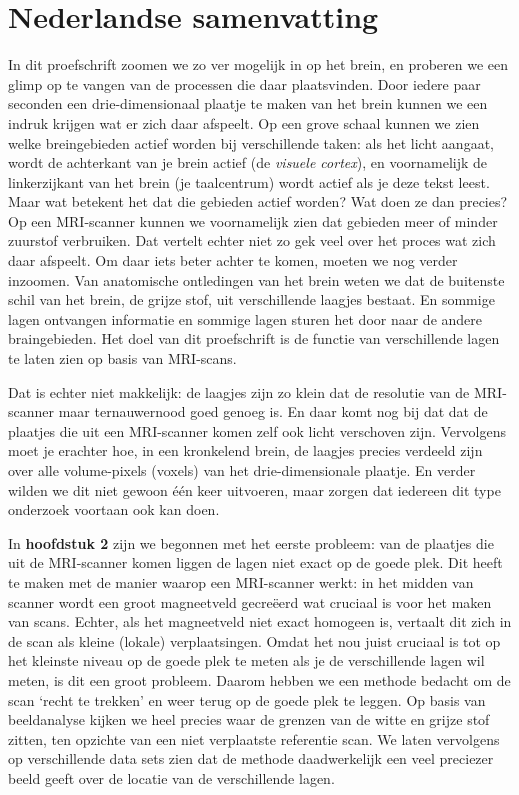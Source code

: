 \section{Nederlandse samenvatting}
In dit proefschrift zoomen we zo ver mogelijk in op het brein, en proberen we een glimp op te vangen van de processen die daar plaatsvinden. Door iedere paar seconden een drie-dimensionaal plaatje te maken van het brein kunnen we een indruk krijgen wat er zich daar afspeelt. Op een grove schaal kunnen we zien welke breingebieden actief worden bij verschillende taken: als het licht aangaat, wordt de achterkant van je brein actief (de \emph{visuele cortex}), en voornamelijk de linkerzijkant van het brein (je taalcentrum) wordt actief als je deze tekst leest. Maar wat betekent het dat die gebieden actief worden? Wat doen ze dan precies? Op een MRI-scanner kunnen we voornamelijk zien dat gebieden meer of minder zuurstof verbruiken. Dat vertelt echter niet zo gek veel over het proces wat zich daar afspeelt. Om daar iets beter achter te komen, moeten we nog verder inzoomen. Van anatomische ontledingen van het brein weten we dat de buitenste schil van het brein, de grijze stof, uit verschillende laagjes bestaat. En sommige lagen ontvangen informatie en sommige lagen sturen het door naar de andere braingebieden. Het doel van dit proefschrift is de functie van verschillende lagen te laten zien op basis van MRI-scans.

Dat is echter niet makkelijk: de laagjes zijn zo klein dat de resolutie van de MRI-scanner maar ternauwernood goed genoeg is. En daar komt nog bij dat dat de plaatjes die uit een MRI-scanner komen zelf ook licht verschoven zijn. Vervolgens moet je erachter hoe, in een kronkelend brein, de laagjes precies verdeeld zijn over alle volume-pixels (voxels) van het drie-dimensionale plaatje. En verder wilden we dit niet gewoon \'e\'en keer uitvoeren, maar zorgen dat iedereen dit type onderzoek voortaan ook kan doen.

In \textbf{hoofdstuk 2} zijn we begonnen met het eerste probleem: van de plaatjes die uit de MRI-scanner komen liggen de lagen niet exact op de goede plek. Dit heeft te maken met de manier waarop een MRI-scanner werkt: in het midden van scanner wordt een groot magneetveld gecre\"eerd wat cruciaal is voor het maken van scans. Echter, als het magneetveld niet exact homogeen is, vertaalt dit zich in de scan als kleine (lokale) verplaatsingen. Omdat het nou juist cruciaal is tot op het kleinste niveau op de goede plek te meten als je de verschillende lagen wil meten, is dit een groot probleem. Daarom hebben we een methode bedacht om de scan `recht te trekken' en weer terug op de goede plek te leggen. Op basis van beeldanalyse kijken we heel precies waar de grenzen van de witte en grijze stof zitten, ten opzichte van een niet verplaatste referentie scan. We laten vervolgens op verschillende data sets zien dat de methode daadwerkelijk een veel preciezer beeld geeft over de locatie van de verschillende lagen. 

